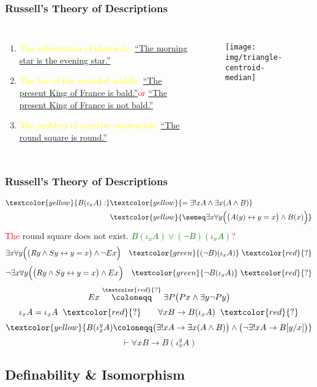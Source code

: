 \documentclass[UTF8,aspectratio=43,11pt,colorlinks,compress,openany]{beamer}%
\begin{document}
\begin{frame}\frametitle{Russell's Theory of Descriptions}
\begin{columns}
\begin{enumerate}
	\item \textcolor{yellow}{The substitution of identicals.}
	\underline{``The morning star is the evening star.''}
	\item \textcolor{yellow}{The law of the excluded middle.}
	\underline{``The present King of France is bald.''}\;\;\textcolor{red}{or}
	\underline{``The present King of France is not bald.''}
	\item \textcolor{yellow}{The problem of negative existentials.}
	\underline{``The round square is round.''}
\end{enumerate}
\begin{figure}
\texttt{[image: img/triangle-centroid-median]}
\end{figure}
\end{columns}
\end{frame}

\begin{frame}\frametitle{Russell's Theory of Descriptions}
\begin{align*}
\textcolor{yellow}{B(\iota_x A):}&\textcolor{yellow}{=\exists! x A\wedge\exists x(A\wedge B)}\\
&\textcolor{yellow}{\semeq\exists x\forall y\Big(\big(A(y)\leftrightarrow y=x\big)\wedge B(x)\Big)}
\end{align*}
\textcolor{red}{The} round square does not exist. \textcolor{green}{$B(\iota_x A)\vee(\neg B)(\iota_x A)$}\;\textcolor{red}{?}
\[\exists x\forall y\Big(\big(Ry\wedge Sy\leftrightarrow y=x\big)\wedge\neg Ex\Big)\quad\textcolor{green}{(\neg B)(\iota_x A)}\;\textcolor{red}{?}\]
\[\neg\exists x\forall y\Big(\big(Ry\wedge Sy\leftrightarrow y=x\big)\wedge Ex\Big)\quad\textcolor{green}{\neg B(\iota_x A)}\;\textcolor{red}{?}\]
\[Ex\stackrel{\textcolor{red}{?}}{\coloneqq }\exists P\big(Px\wedge\exists y\neg Py\big)\]
\[\iota_x A=\iota_x A\;\;\textcolor{red}{?}\qquad \forall x B\to B(\iota_x A)\;\;\textcolor{red}{?}\]
\[\textcolor{yellow}{B(\iota_x^y A)\coloneqq \big(\exists!x A\to\exists x(A\wedge B)\big)\wedge\big(\neg\exists!x A\to B[y/x]\big)}\]
\[\vdash\forall x B\to B(\iota_x^y A)\]
\end{frame}

\subsection{Definability \& Isomorphism}
\end{document}
